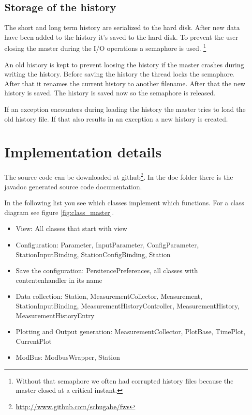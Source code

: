 \subsection{Storage of the history} %
\label{sub:storage_of_the_history}
The short and long term history are serialized to the hard disk. After new data have been added to the history it's saved to the hard disk. To prevent the user closing the master during the I/O operations a semaphore is used. \footnote{Without that semaphore we often had corrupted history files because the master closed at a critical instant.}

An old history is kept to prevent loosing the history if the master crashes during writing the history. Before saving the history the thread locks the semaphore. After that it renames the current history to another filename. After that the new history is saved. The history is saved now so the semaphore is released.

If an exception encounters during loading the history the master tries to load the old history file. If that also results in an exception a new history is created.

\section{Implementation details} %
\label{sec:implementation_details}
The source code can be downloaded at github\footnote{\url{http://www.github.com/schugabe/fws}}. In the doc folder there is the javadoc generated source code documentation.

In the following list you see which classes implement which functions. For a class diagram see figure \ref{fig:class_master}.

\begin{itemize}
    \item View: All classes that start with view
    \item Configuration: Parameter, InputParameter, ConfigParameter, StationInputBinding, StationConfigBinding, Station
    \item Save the configuration: PersitencePreferences, all classes with contentenhandler in its name
    \item Data collection: Station, MeasurementCollector, Measurement, StationInputBinding, MeasurementHistoryController, MeasurementHistory, MeasurementHistoryEntry
    \item Plotting and Output generation: MeasurementCollector, PlotBase, TimePlot, CurrentPlot
    \item ModBus: ModbusWrapper, Station
\end{itemize}

